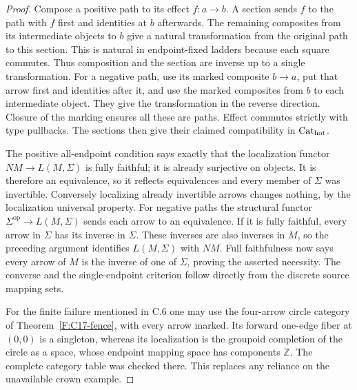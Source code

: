 \begin{proof}
Compose a positive path to its effect $f:a\to b$. A section sends
$f$ to the path with $f$ first and identities at $b$ afterwards.
The remaining composites from its intermediate objects to $b$
give a natural transformation from the original path to this
section. This is natural in endpoint-fixed ladders because each
square commutes. Thus composition and the section are inverse
up to a single transformation. For a negative path, use its
marked composite $b\to a$, put that arrow first and identities
after it, and use the marked composites from $b$ to each
intermediate object. They give the transformation in the reverse
direction. Closure of the marking ensures all these are paths.
Effect commutes strictly with type pullbacks. The sections then
give their claimed compatibility in $\mathrm {Cat}_{\mathrm{hot}}$.

The positive all-endpoint condition says exactly that the
localization functor $NM\to L(M,\Sigma)$ is fully faithful;
it is already surjective on objects. It is therefore an
equivalence, so it reflects equivalences and every member of
$\Sigma$ was invertible. Conversely localizing already invertible
arrows changes nothing, by the localization universal property.
For negative paths the structural functor
$\Sigma^{\mathrm{op}}\to L(M,\Sigma)$ sends each arrow to an
equivalence. If it is fully faithful, every arrow in $\Sigma$
has its inverse in $\Sigma$. These inverses are also inverses in
$M$, so the preceding argument identifies $L(M,\Sigma)$ with
$NM$. Full faithfulness now says every arrow of $M$ is the inverse
of one of $\Sigma$, proving the asserted necessity. The converse
and the single-endpoint criterion follow directly from the
discrete source mapping sets.

For the finite failure mentioned in C.6 one may use the four-arrow
circle category of Theorem~\ref{F:C17-fence}, with every arrow
marked. Its forward one-edge fiber at $(0,0)$ is a singleton,
whereas its localization is the groupoid completion of the
circle as a space, whose endpoint mapping space has components
$\mathbb Z$. The complete category table was checked there.
This replaces any reliance on the unavailable crown example.
\end{proof}


